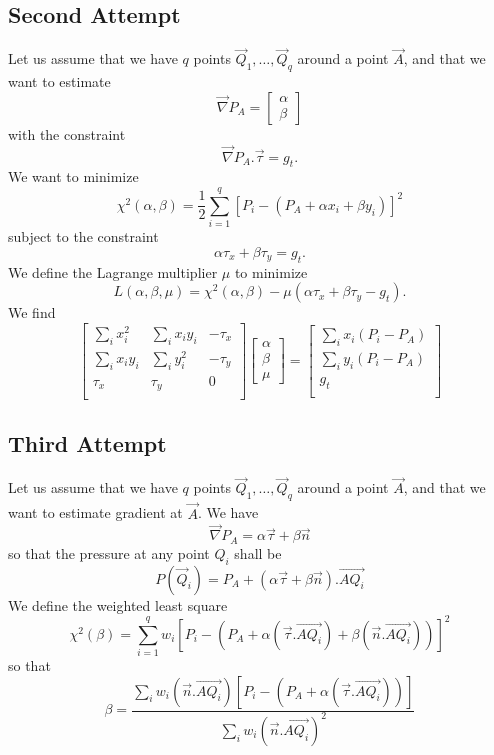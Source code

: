 \documentclass[aps]{revtex4}
\newcommand{\myvec}[1]{\overrightarrow{#1}}
\newcommand{\mygrad}{\vec{\nabla}}
\begin{document}
\subsection{Second Attempt}
Let us assume that we have $q$ points $\vec{Q}_1,\ldots,\vec{Q}_{q}$ around a point $\vec{A}$, and that we want to
estimate 
$$
	\mygrad P_A = \begin{bmatrix}
	\alpha \\
	\beta
	\end{bmatrix}
$$
with the constraint
$$
	\mygrad P_A . \vec{\tau} = g_t.
$$
We want to minimize
$$
	\chi^2(\alpha,\beta) = \dfrac{1}{2} \sum_{i=1}^q \left\lbrack P_i - \left(P_A+\alpha x_i + \beta y_i\right) \right\rbrack^2
$$
subject to the constraint
$$
	\alpha\tau_x + \beta\tau_y = g_t.
$$
We define the Lagrange multiplier $\mu$ to minimize
$$
	L(\alpha,\beta,\mu) = \chi^2(\alpha,\beta) - \mu \left( \alpha\tau_x + \beta\tau_y - g_t\right).
$$
We find
$$
	\begin{bmatrix}
	\sum_i x_i^2 & \sum_i x_i y_i & -\tau_x\\
	 \sum_i x_i y_i &\sum_i y_i^2 & -\tau_y\\
	\tau_x & \tau_y & 0\\
	\end{bmatrix}
	\begin{bmatrix}
	\alpha\\
	\beta\\
	\mu
	\end{bmatrix}
	=
	\begin{bmatrix}
	\sum_i x_i\left(P_i-P_A\right)\\
	\sum_i y_i\left(P_i-P_A\right)\\
	g_t\\
	\end{bmatrix}
$$

\subsection{Third Attempt}
Let us assume that we have $q$ points $\vec{Q}_1,\ldots,\vec{Q}_{q}$ around a point $\vec{A}$, and that we want to
estimate gradient at $\vec{A}$.
We have
$$
	\mygrad P_A = \alpha \vec{\tau} + \beta \vec{n}
$$
so that the pressure at any point $Q_i$ shall be
$$
	P\left(\vec{Q}_i\right)= P_A + \left(\alpha \vec{\tau} + \beta \vec{n}\right).\myvec{AQ_i}
$$
We define the weighted least square
$$
	\chi^2(\beta) = \sum_{i=1}^q w_i \left\lbrack P_i - \left(P_A+\alpha \left(\vec{\tau}.\myvec{AQ_i}\right) + \beta \left(\vec{n}.\myvec{AQ_i}\right) \right)\right\rbrack^2
$$
so that
$$
	\beta = \dfrac{\displaystyle \sum_i w_i \left(\vec{n}.\myvec{AQ_i}\right)
	 \left\lbrack P_i - \left(P_A + \alpha \left(\vec{\tau}.\myvec{AQ_i}\right) \right)\right\rbrack}
	{\displaystyle \sum_i w_i \left(\vec{n}.\myvec{AQ_i}\right)^2}
$$
\end{document}
